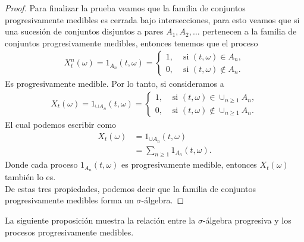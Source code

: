 \begin{proof}
Para finalizar la prueba veamos que la familia de conjuntos progresivamente medibles es cerrada bajo intersecciones, para esto veamos que si una sucesión de conjuntos disjuntos a pares $A_1, A_2, \ldots$ pertenecen a la familia de conjuntos progresivamente medibles, entonces tenemos que el proceso
    \begin{align*}
	X_t^{n} (\omega) = 1_{A_n} (t, \omega) =
    \begin{cases}
    1, & \text{ si } (t, \omega) \in A_n, \\
    0, & \text{ si } (t, \omega) \notin A_n.
	\end{cases}
	\end{align*}
Es progresivamente medible. Por lo tanto, si consideramos a 
    \begin{align*}
	X_t (\omega) = 1_{\cup A_n} (t, \omega) =
    \begin{cases}
    1, & \text{ si } (t, \omega) \in \cup_{n \geq 1} A_n, \\
    0, & \text{ si } (t, \omega) \notin \cup_{n \geq 1} A_n.
	\end{cases}
	\end{align*}
El cual podemos escribir como
    \begin{align*}
	X_t (\omega) & = 1_{\cup A_n} (t, \omega) \\
    & = \sum_{n \geq 1} 1_{A_n} (t, \omega).
	\end{align*}
Donde cada proceso $1_{A_n} (t, \omega)$ es progresivamente medible, entonces $X_t (\omega)$ también lo es. \\

De estas tres propiedades, podemos decir que la familia de conjuntos progresivamente medibles forma un $\sigma$-álgebra.
\end{proof}

La siguiente proposición muestra la relación entre la $\sigma$-álgebra progresiva y los procesos progresivamente medibles.

